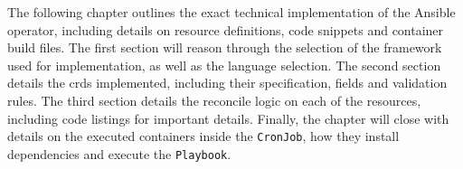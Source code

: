 The following chapter outlines the exact technical implementation of the Ansible operator, including details on resource definitions, code snippets and container build files.
The first section will reason through the selection of the framework used for implementation, as well as the language selection.
The second section details the \glspl{crd} implemented, including their specification, fields and validation rules.
The third section details the reconcile logic on each of the resources, including code listings for important details.
Finally, the chapter will close with details on the executed containers inside the \texttt{CronJob}, how they install dependencies and execute the \texttt{Playbook}.
